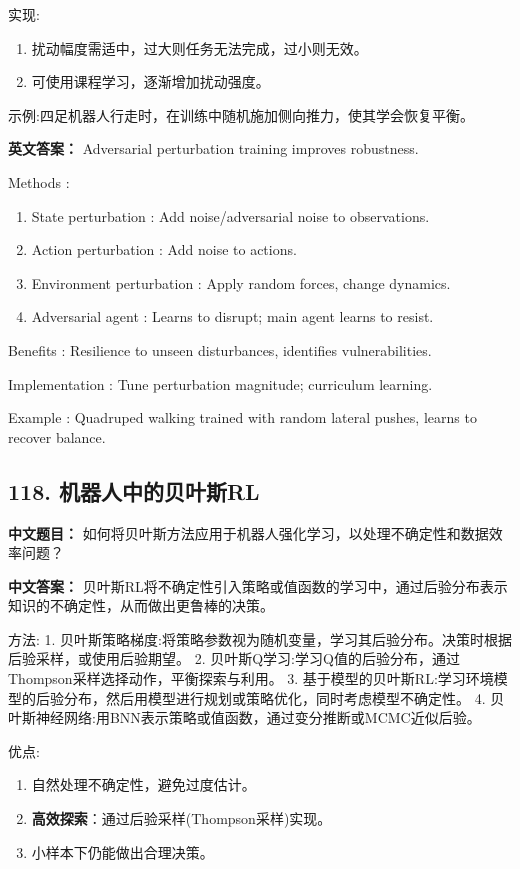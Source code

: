 \documentclass[10pt,a4paper]{ctexart}
\begin{document}
 实现:
\begin{enumerate}
    \item 扰动幅度需适中，过大则任务无法完成，过小则无效。
    \item 可使用课程学习，逐渐增加扰动强度。
\end{enumerate}

 示例:四足机器人行走时，在训练中随机施加侧向推力，使其学会恢复平衡。

\textbf{英文答案：}  
Adversarial perturbation training improves robustness.

 Methods :
\begin{enumerate}
    \item State perturbation : Add noise/adversarial noise to observations.
    \item Action perturbation : Add noise to actions.
    \item Environment perturbation : Apply random forces, change dynamics.
    \item Adversarial agent : Learns to disrupt; main agent learns to resist.
\end{enumerate}

 Benefits : Resilience to unseen disturbances, identifies vulnerabilities.

 Implementation : Tune perturbation magnitude; curriculum learning.

 Example : Quadruped walking trained with random lateral pushes, learns to recover balance.

\subsection*{118. 机器人中的贝叶斯RL}
\textbf{中文题目：} 如何将贝叶斯方法应用于机器人强化学习，以处理不确定性和数据效率问题？

\textbf{中文答案：}  
贝叶斯RL将不确定性引入策略或值函数的学习中，通过后验分布表示知识的不确定性，从而做出更鲁棒的决策。

 方法:
1.  贝叶斯策略梯度:将策略参数视为随机变量，学习其后验分布。决策时根据后验采样，或使用后验期望。
2.  贝叶斯Q学习:学习Q值的后验分布，通过Thompson采样选择动作，平衡探索与利用。
3.  基于模型的贝叶斯RL:学习环境模型的后验分布，然后用模型进行规划或策略优化，同时考虑模型不确定性。
4.  贝叶斯神经网络:用BNN表示策略或值函数，通过变分推断或MCMC近似后验。

 优点:
\begin{enumerate}
    \item 自然处理不确定性，避免过度估计。
    \item \textbf{高效探索}：通过后验采样(Thompson采样)实现。
    \item 小样本下仍能做出合理决策。
\end{enumerate}
\end{document}
